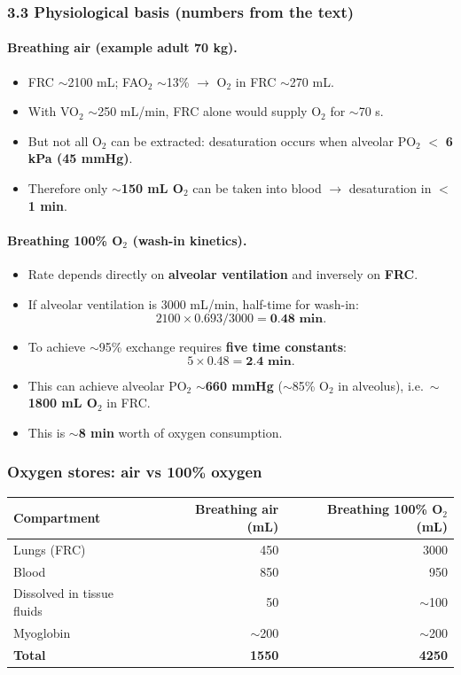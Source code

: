 \documentclass[11pt,a4paper]{article}
\begin{document}
\subsubsection{3.3 Physiological basis (numbers from the text)}

\paragraph{Breathing air (example adult 70 kg).}
\begin{itemize}
  \item FRC $\sim$2100 mL; FAO$_2$ $\sim$13\% $\rightarrow$ O$_2$ in FRC $\sim$270 mL.
  \item With VO$_2$ $\sim$250 mL/min, FRC alone would supply O$_2$ for $\sim$70 s.
  \item But not all O$_2$ can be extracted: desaturation occurs when alveolar PO$_2$ $<$ \textbf{6 kPa (45 mmHg)}.
  \item Therefore only $\sim$\textbf{150 mL O$_2$} can be taken into blood $\rightarrow$ desaturation in \textbf{$<$1 min}.
\end{itemize}

\paragraph{Breathing 100\% O$_2$ (wash-in kinetics).}
\begin{itemize}
  \item Rate depends directly on \textbf{alveolar ventilation} and inversely on \textbf{FRC}.
  \item If alveolar ventilation is 3000 mL/min, half-time for wash-in:
  \[
    2100 \times 0.693 / 3000 = \textbf{0.48 min}.
  \]
  \item To achieve $\sim$95\% exchange requires \textbf{five time constants}:
  \[
    5 \times 0.48 = \textbf{2.4 min}.
  \]
  \item This can achieve alveolar PO$_2$ $\sim$\textbf{660 mmHg} ($\sim$85\% O$_2$ in alveolus), i.e.\ $\sim$\textbf{1800 mL O$_2$} in FRC.
  \item This is $\sim$\textbf{8 min} worth of oxygen consumption.
\end{itemize}

\subsubsection{Oxygen stores: air vs 100\% oxygen}
\begin{center}
\begin{tabular}{lrr}
\hline
\textbf{Compartment} & \textbf{Breathing air (mL)} & \textbf{Breathing 100\% O$_2$ (mL)} \\
\hline
Lungs (FRC) & 450 & 3000 \\
Blood & 850 & 950 \\
Dissolved in tissue fluids & 50 & $\sim$100 \\
Myoglobin & $\sim$200 & $\sim$200 \\
\textbf{Total} & \textbf{1550} & \textbf{4250} \\
\hline
\end{tabular}
\end{center}
\end{document}
